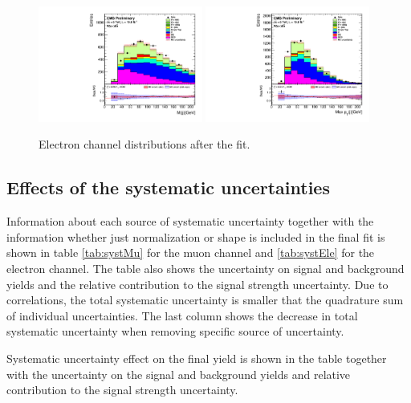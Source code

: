 \begin{figure}[htbp]
		\includegraphics[width=0.48\textwidth]{Figures/Results/Electron/postfit/Wbb_H_mass_doQCD1.pdf}
		\includegraphics[width=0.48\textwidth]{Figures/Results/Electron/postfit/Wbb_max_hJet_pt_doQCD1.pdf}		
	\caption{Electron channel distributions after the fit.}
	\label{fig:Wbb_postfit_ele}
\end{figure}

\subsection{Effects of the systematic uncertainties}
\label{sec:systEff}

Information about each source of systematic uncertainty together with the information whether just normalization or shape is included in the final fit is shown in table \ref{tab:systMu} for the muon channel and \ref{tab:systEle} for the electron channel. The table also shows the uncertainty on signal and background yields and the relative contribution to the signal strength uncertainty.
Due to correlations, the total systematic uncertainty is smaller that the quadrature sum of individual uncertainties. The last column shows the decrease in total systematic uncertainty when removing specific source of uncertainty.

\begin{table}
\caption[Systematic uncertainties in the muon channel.]{Systematic uncertainty effect on the final yield is shown in the table together with the uncertainty on the signal and background yields and relative contribution to the signal strength uncertainty. }
\label{tab:systMu}

\end{table}

